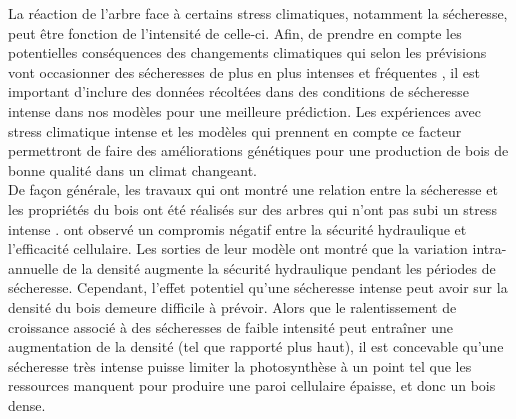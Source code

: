 \documentclass{report}
\begin{document}
La réaction de l'arbre face à certains stress climatiques, notamment la sécheresse, peut être fonction de l'intensité de celle-ci. Afin, de prendre en compte les potentielles conséquences des changements climatiques qui selon les prévisions vont occasionner des sécheresses de plus en plus intenses et fréquentes \citep{IPCC_2015}, il est important d'inclure des données récoltées dans des conditions de sécheresse intense dans nos modèles pour une meilleure prédiction. Les expériences avec stress climatique intense et les modèles qui prennent en compte ce facteur permettront de faire des améliorations génétiques pour une production de bois de bonne qualité dans un climat changeant.\\

De façon générale, les travaux qui ont montré une relation entre la sécheresse et les propriétés du bois ont été réalisés sur des arbres qui n'ont pas subi un stress intense \citep{Xu2012,Drew2009,Campelo2013,Jyske2009,Wilkinson2015}. \cite{Wilkinson2015} ont observé un compromis négatif entre la sécurité hydraulique et l'efficacité cellulaire. %
Les sorties de leur modèle ont montré que la variation intra-annuelle de la densité augmente la sécurité hydraulique pendant les périodes de sécheresse. Cependant, l'effet potentiel qu'une sécheresse intense peut avoir sur la densité du bois demeure difficile à prévoir. Alors que le ralentissement de croissance associé à des sécheresses de faible intensité peut entraîner une augmentation de la densité (tel que rapporté plus haut), il est concevable qu'une sécheresse très intense puisse limiter la photosynthèse à un point tel que les ressources manquent pour produire une paroi cellulaire épaisse, et donc un bois dense.\\ %
\end{document}
